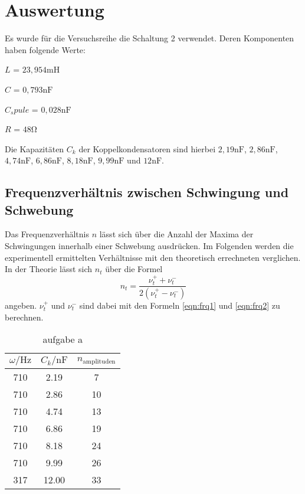 \section{Auswertung}
\label{sec:Auswertung}

Es wurde für die Versuchsreihe die Schaltung 2 verwendet. Deren Komponenten haben folgende Werte:

$L$ = $23,954 \si{\milli\henry}$

$C$ = $0,793 \si{\nano\farad}$

$C_spule$ = $0,028 \si{\nano\farad}$

$R$ = $48 \si{\ohm}$

Die Kapazitäten $C_k$ der Koppelkondensatoren sind hierbei $2,19 \si{\nano\farad}$, $2,86 \si{\nano\farad}$,
$4,74 \si{\nano\farad}$, $6,86 \si{\nano\farad}$, $8,18 \si{\nano\farad}$, $9,99 \si{\nano\farad}$ und
$12 \si{\nano\farad}$.

\subsection{Frequenzverhältnis zwischen Schwingung und Schwebung}

Das Frequenzverhältnis $n$ lässt sich über die Anzahl der Maxima der Schwingungen innerhalb einer Schwebung 
ausdrücken. Im Folgenden werden die experimentell ermittelten Verhältnisse mit den theoretisch errechneten verglichen.
In der Theorie lässt sich $n_t$ über die Formel \begin{equation}
    \label{eqn:n}
    n_t = \frac{\nu_{t}^{+} + \nu_{t}^{-}}{2(\nu_{t}^{+} - \nu_{t}^{-})}
\end{equation}
angeben. $\nu_{t}^{+}$ und $\nu_{t}^{-}$ sind dabei mit den Formeln \ref{eqn:frq1} und \ref{eqn:frq2} zu berechnen.


\begin{table}
    \centering
    \caption{aufgabe a}
    \label{tab:a}
    \begin{tabular}{c c c}
        \toprule
        {$\omega / \si{\hertz}$} & {$C_k / \si{\nano\farad}$} & {$n_\text{amplituden}$} \\
        \midrule
        710 &  2.19 &  7 \\  
        710 &  2.86 & 10 \\
        710 &  4.74 & 13 \\
        710 &  6.86 & 19 \\
        710 &  8.18 & 24 \\
        710 &  9.99 & 26 \\
        317 & 12.00 & 33 \\
        \bottomrule
    \end{tabular}
\end{table}

